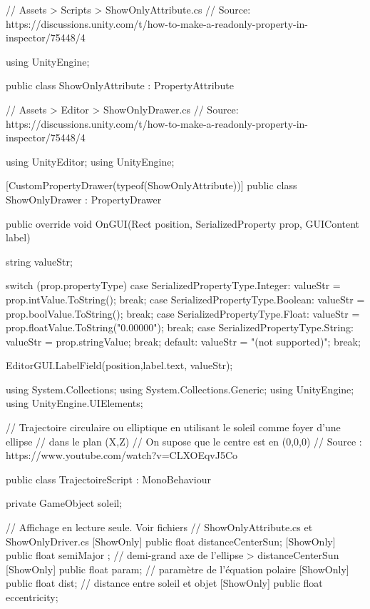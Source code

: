 \documentclass[a4paper,10pt]{article}
\newenvironment{solution}%
{\begin{tcolorbox}[breakable,colback=red!5!white,colframe=red!75!black,title=Solution]}%
{\end{tcolorbox}}
\newenvironment{boxcode}%
{\begin{tcolorbox}[breakable,colback=gray!5!white,colframe=black]}%
	{\end{tcolorbox}}
\begin{document}
\begin{solution}
\begin{boxcode}
	\begin{csharpsansbord}
// Assets > Scripts > ShowOnlyAttribute.cs
// Source: https://discussions.unity.com/t/how-to-make-a-readonly-property-in-inspector/75448/4
	
using UnityEngine;

public class ShowOnlyAttribute : PropertyAttribute
{
	
}
	\end{csharpsansbord}
\end{boxcode}


\begin{boxcode}
	\begin{csharpsansbord}
// Assets > Editor > ShowOnlyDrawer.cs
// Source: https://discussions.unity.com/t/how-to-make-a-readonly-property-in-inspector/75448/4

using UnityEditor;
using UnityEngine;

[CustomPropertyDrawer(typeof(ShowOnlyAttribute))]
public class ShowOnlyDrawer : PropertyDrawer
{
	public override void OnGUI(Rect position, SerializedProperty prop, GUIContent label)
	{
		string valueStr;
		
		switch (prop.propertyType)
		{
			case SerializedPropertyType.Integer:
			valueStr = prop.intValue.ToString();
			break;
			case SerializedPropertyType.Boolean:
			valueStr = prop.boolValue.ToString();
			break;
			case SerializedPropertyType.Float:
			valueStr = prop.floatValue.ToString("0.00000");
			break;
			case SerializedPropertyType.String:
			valueStr = prop.stringValue;
			break;
			default:
			valueStr = "(not supported)";
			break;
		}
		
		EditorGUI.LabelField(position,label.text, valueStr);
	}
}	
	\end{csharpsansbord}
\end{boxcode}


\begin{boxcode}
	\begin{csharpsansbord}
using System.Collections;
using System.Collections.Generic;
using UnityEngine;
using UnityEngine.UIElements;

// Trajectoire circulaire ou elliptique en utilisant le soleil comme foyer d'une ellipse
//  dans le plan (X,Z)
// On supose que le centre est en (0,0,0)
// Source : https://www.youtube.com/watch?v=CLXOEqvJ5Co

public class TrajectoireScript : MonoBehaviour
{
	private GameObject soleil;
	
	// Affichage en lecture seule. Voir fichiers
	// ShowOnlyAttribute.cs et ShowOnlyDriver.cs
	[ShowOnly] public float distanceCenterSun;
	[ShowOnly] public float semiMajor ; // demi-grand axe de l'ellipse > distanceCenterSun
	[ShowOnly] public float param; // paramètre de l'équation polaire
	[ShowOnly] public float dist; // distance entre soleil et objet
	[ShowOnly] public float eccentricity;
	
}
\end{csharpsansbord}
\end{boxcode}
\end{solution}
\end{document}
